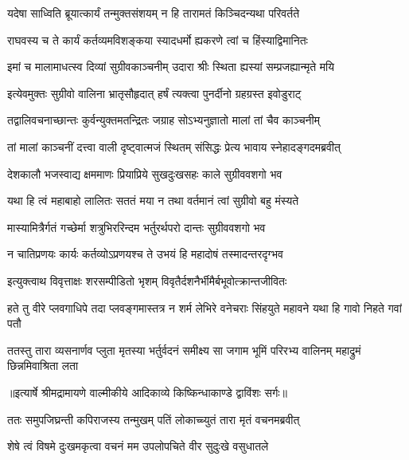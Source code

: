 \twolineshloka
{यदेषा साध्विति ब्रूयात्कार्यं तन्मुक्तसंशयम्}
{न हि तारामतं किञ्चिदन्यथा परिवर्तते} %

\twolineshloka
{राघवस्य च ते कार्यं कर्तव्यमविशङ्कया}
{स्यादधर्मो ह्यकरणे त्वां च हिंस्याद्विमानितः} %

\twolineshloka
{इमां च मालामाधत्स्व दिव्यां सुग्रीवकाञ्चनीम्}
{उदारा श्रीः स्थिता ह्यस्यां सम्प्रजह्यान्मृते मयि} %

\twolineshloka
{इत्येवमुक्तः सुग्रीवो वालिना भ्रातृसौहृदात्}
{हर्षं त्यक्त्वा पुनर्दीनो ग्रहग्रस्त इवोडुराट्} %

\twolineshloka
{तद्वालिवचनाच्छान्तः कुर्वन्युक्तमतन्द्रितः}
{जग्राह सोऽभ्यनुज्ञातो मालां तां चैव काञ्चनीम्} %

\twolineshloka
{तां मालां काञ्चनीं दत्त्वा वाली दृष्ट्वात्मजं स्थितम्}
{संसिद्धः प्रेत्य भावाय स्नेहादङ्गदमब्रवीत्} %

\twolineshloka
{देशकालौ भजस्वाद्य क्षममाणः प्रियाप्रिये}
{सुखदुःखसहः काले सुग्रीववशगो भव} %

\twolineshloka
{यथा हि त्वं महाबाहो लालितः सततं मया}
{न तथा वर्तमानं त्वां सुग्रीवो बहु मंस्यते} %

\twolineshloka
{मास्यामित्रैर्गतं गच्छेर्मा शत्रुभिररिन्दम}
{भर्तुरर्थपरो दान्तः सुग्रीववशगो भव} %

\twolineshloka
{न चातिप्रणयः कार्यः कर्तव्योऽप्रणयश्च ते}
{उभयं हि महादोषं तस्मादन्तरदृग्भव} %

\twolineshloka
{इत्युक्त्वाथ विवृत्ताक्षः शरसम्पीडितो भृशम्}
{विवृतैर्दशनैर्भीमैर्बभूवोत्क्रान्तजीवितः} %

\fourlineindentedshloka
{हते तु वीरे प्लवगाधिपे तदा}
{प्लवङ्गमास्तत्र न शर्म लेभिरे}
{वनेचराः सिंहयुते महावने}
{यथा हि गावो निहते गवां पतौ} %

\fourlineindentedshloka
{ततस्तु तारा व्यसनार्णव प्लुता}
{मृतस्या भर्तुर्वदनं समीक्ष्य सा}
{जगाम भूमिं परिरभ्य वालिनम्}
{महाद्रुमं छिन्नमिवाश्रिता लता} %


{॥इत्यार्षे श्रीमद्रामायणे वाल्मीकीये आदिकाव्ये किष्किन्धाकाण्डे द्वाविंशः सर्गः॥}


\twolineshloka
{ततः समुपजिघ्रन्ती कपिराजस्य तन्मुखम्}
{पतिं लोकाच्च्युतं तारा मृतं वचनमब्रवीत्} %

\twolineshloka
{शेषे त्वं विषमे दुःखमकृत्वा वचनं मम}
{उपलोपचिते वीर सुदुःखे वसुधातले} %

